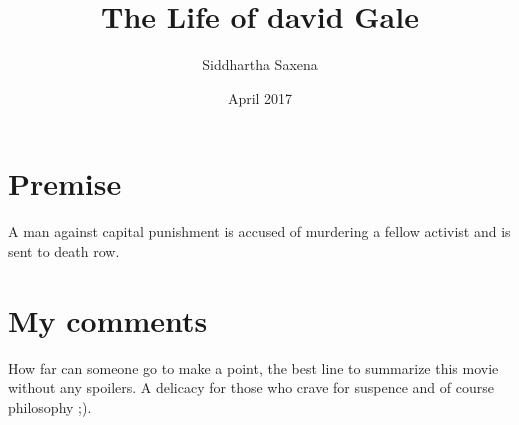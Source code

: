 \documentclass{article}
\title{The Life of david Gale}
\author{Siddhartha Saxena}
\date{April 2017}
\begin{document}
\maketitle

\section{Premise}
A man against capital punishment is accused of murdering a fellow activist and is sent to death row.
\section{My comments}
How far can someone go to make a point, the best line to summarize this movie without any spoilers. A delicacy for those who crave for suspence and of course philosophy ;). 
\end{document}
